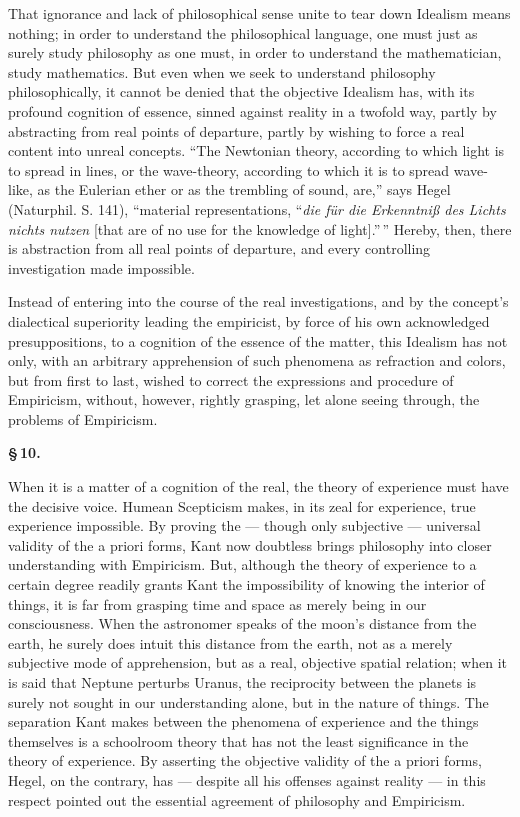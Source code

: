 \documentclass[12pt]{book}
\begin{document}
That ignorance and lack of philosophical sense unite to tear down Idealism means
nothing; in order to understand the philosophical language, one must just as surely
study philosophy as one must, in order to understand the mathematician, study
mathematics.
But even when we seek to understand philosophy philosophically, it cannot be denied
that the objective Idealism has, with its profound cognition of essence, sinned
against reality in a twofold way, partly by abstracting from real points of
departure, partly by wishing to force a real content into unreal concepts. ``The
Newtonian theory, according to which light is to spread in lines, or the
wave-theory, according to which it is to spread wave-like, as the Eulerian ether or
as the trembling of sound, are,'' says Hegel (Naturphil. S. 141), ``material
representations, ``\textit{die für die Erkenntniß des Lichts nichts nutzen} [that
are of no use for the knowledge of light].''\,'' Hereby, then, there is abstraction
from all real points of departure, and every controlling investigation made
impossible.

Instead of entering into the course of the real investigations, and by the
concept's dialectical superiority leading the empiricist, by force of his own
acknowledged presuppositions, to a cognition of the essence of the matter, this
Idealism has not only, with an arbitrary apprehension of such phenomena as
refraction and colors, but from first to last, wished to correct the expressions
and procedure of Empiricism, without, however, rightly grasping, let alone seeing
through, the problems of Empiricism.

\begin{center}{\bfseries \S\,10.}\end{center}

When it is a matter of a cognition of the real, the theory of experience must have
the decisive voice. Humean Scepticism makes, in its zeal for experience, true
experience impossible. By proving the — though only subjective — universal validity
of the a priori forms, Kant now doubtless brings philosophy into closer
understanding with Empiricism. But, although the theory of experience to a certain
degree readily grants Kant the impossibility of knowing the interior of things, it
is far from grasping time and space as merely being in our consciousness. When the
astronomer speaks of the moon's distance from the earth, he surely does intuit this
distance from the earth, not as a merely subjective mode of apprehension,
but as a real, objective spatial relation; when it is said that Neptune perturbs
Uranus, the reciprocity between the planets is surely not sought in our
understanding alone, but in the nature of things. The separation Kant makes between
the phenomena of experience and the things themselves is a schoolroom theory that
has not the least significance in the theory of experience. By asserting the
objective validity of the a priori forms, Hegel, on the contrary, has — despite all
his offenses against reality — in this respect pointed out the essential agreement
of philosophy and Empiricism.
\end{document}
